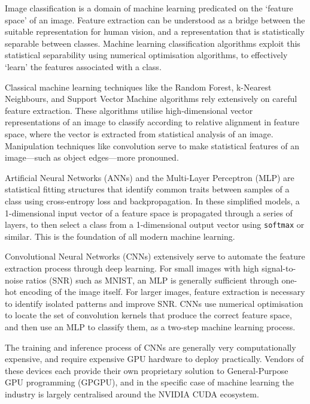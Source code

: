 \documentclass[10pt, a4paper]{article}
\begin{document}
Image classification is a domain of machine learning predicated on the `feature space' of an image. Feature extraction can be understood as a bridge between the suitable representation for human vision, and a representation that is statistically separable between classes. Machine learning classification algorithms exploit this statistical separability using numerical optimisation algorithms, to effectively `learn' the features associated with a class.

Classical machine learning techniques like the Random Forest\cite{breiman_random_2001}, k-Nearest Neighbours\cite{cover_nearest_1967}, and Support Vector Machine\cite{cortes_support-vector_1995} algorithms rely extensively on careful feature extraction. These algorithms utilise high-dimensional vector representations of an image to classify according to relative alignment in feature space, where the vector is extracted from statistical analysis of an image. Manipulation techniques like convolution serve to make statistical features of an image---such as object edges---more pronouned.

Artificial Neural Networks (ANNs) and the Multi-Layer Perceptron (MLP) are statistical fitting structures that identify common traits between samples of a class using cross-entropy loss and backpropagation\cite{rumelhart_learning_1986}. In these simplified models, a 1-dimensional input vector of a feature space is propagated through a series of layers, to then select a class from a 1-dimensional output vector using \texttt{softmax} or similar. This is the foundation of all modern machine learning.

Convolutional Neural Networks (CNNs) extensively serve to automate the feature extraction process through deep learning\cite{lecun_gradient-based_1998}. For small images with high signal-to-noise ratios (SNR) such as MNIST, an MLP is generally sufficient through one-hot encoding of the image itself. For larger images, feature extraction is necessary to identify isolated patterns and improve SNR. CNNs use numerical optimisation to locate the set of convolution kernels that produce the correct feature space, and then use an MLP to classify them, as a two-step machine learning process.

The training and inference process of CNNs are generally very computationally expensive, and require expensive GPU hardware to deploy practically. Vendors of these devices each provide their own proprietary solution to General-Purpose GPU programming (GPGPU), and in the specific case of machine learning the industry is largely centralised around the NVIDIA CUDA ecosystem.
\end{document}
